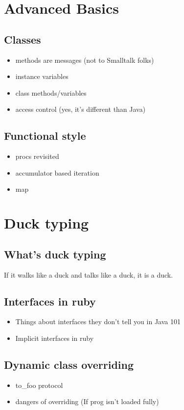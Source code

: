 \documentclass{article}
\begin{document}
\section{Advanced Basics}

\subsection{Classes}
\begin{itemize}
  \item methods are messages (not to Smalltalk folks)
  \item instance variables
  \item class methods/variables
  \item access control (yes, it's different than Java)
\end{itemize}

\subsection{Functional style}
\begin{itemize}
  \item procs revisited
  \item accumulator based iteration
  \item map
\end{itemize}

\section{Duck typing}

\subsection{What's duck typing}
  If it walks like a duck and talks like a duck, it is a duck.

\subsection{Interfaces in ruby}
  \begin{itemize}
    \item Things about interfaces they don't tell you in Java 101
    \item Implicit interfaces in ruby
  \end{itemize}

\subsection{Dynamic class overriding}
  \begin{itemize}
    \item to\_foo protocol
    \item dangers of overriding (If prog isn't loaded fully)
  \end{itemize}
\end{document}
